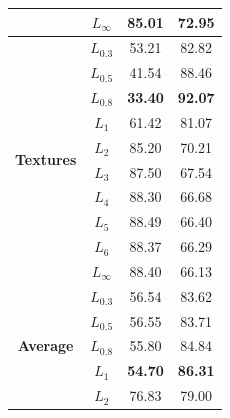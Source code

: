 \documentclass{article}
\begin{document}
\begin{table}[t]
\begin{tabular}{c|c|cc}
                                       & $L_{\infty}$                           & 85.01                & 72.95                \\ \midrule
\multirow{10}{*}{\textbf{Textures}}    & $L_{0.3}$                           & 53.21                & 82.82                \\
                                       & $L_{0.5}$                           & 41.54                & 88.46                \\
                                       & $L_{0.8}$                          & \textbf{33.40}       & \textbf{92.07}       \\
                                       & $L_{1}$                             & 61.42                & 81.07                \\
                                       & $L_{2}$                             & 85.20                & 70.21                \\
                                       & $L_{3}$                             & 87.50                & 67.54                \\
                                       & $L_{4}$                             & 88.30                & 66.68                \\
                                       & $L_{5}$                             & 88.49                & 66.40                \\
                                       & $L_{6}$                             & 88.37                & 66.29                \\
                                       & $L_{\infty}$                           & 88.40                & 66.13                \\ \midrule
\multirow{10}{*}{\textbf{Average}}     & $L_{0.3}$                           & 56.54                & 83.62                \\
                                       & $L_{0.5}$                           & 56.55                & 83.71                \\
                                       & $L_{0.8}$                          & 55.80                & 84.84                \\
                                       & $L_{1}$                             & \textbf{54.70}       & \textbf{86.31}       \\
                                       & $L_{2}$                             & 76.83                & 79.00                \\

\end{tabular}
\end{table}
\end{document}

